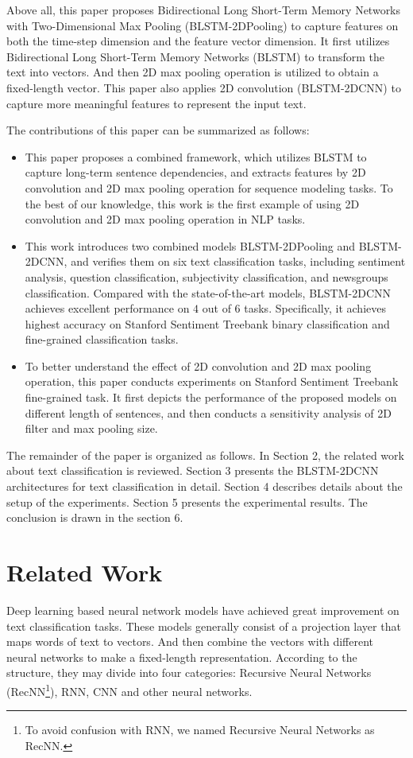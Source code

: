 \documentclass[11pt]{article}
\begin{document}
Above all, this paper proposes Bidirectional Long Short-Term Memory Networks with Two-Dimensional Max Pooling (BLSTM-2DPooling) to capture features on both the time-step dimension and the feature vector dimension. It first utilizes Bidirectional Long Short-Term Memory Networks (BLSTM) to transform the text into vectors. And then 2D max pooling operation is utilized to obtain a fixed-length vector. This paper also applies 2D convolution (BLSTM-2DCNN) to capture more meaningful features to represent the input text. 

The contributions of this paper can be summarized as follows:

\begin{itemize}
\item This paper proposes a combined framework, which utilizes BLSTM to capture long-term sentence dependencies, and extracts features by 2D convolution and 2D max pooling operation for sequence modeling tasks. To the best of our knowledge, this work is the first example of using 2D convolution and 2D max pooling operation in NLP tasks. 


\item This work introduces two combined models BLSTM-2DPooling and BLSTM-2DCNN, and verifies them on six text classification tasks, including sentiment analysis, question classification, subjectivity classification, and newsgroups classification. Compared with the state-of-the-art models, BLSTM-2DCNN achieves excellent performance on $4$ out of $6$ tasks. Specifically, it achieves highest accuracy on Stanford Sentiment Treebank binary classification and fine-grained classification tasks.

\item To better understand the effect of 2D convolution and 2D max pooling operation, this paper conducts experiments on Stanford Sentiment Treebank fine-grained task. It first depicts the performance of the proposed models on different length of sentences, and then conducts a sensitivity analysis of 2D filter and max pooling size. 
\end{itemize}

The remainder of the paper is organized as follows. In Section 2, the related work about text classification is reviewed. Section 3 presents the BLSTM-2DCNN architectures for text classification in detail. Section 4 describes details about the setup of the experiments. Section 5 presents the experimental results. The conclusion is drawn in the section 6.


\section{Related Work}
Deep learning based neural network models have achieved great improvement on text classification tasks. These models generally consist of a projection layer that maps words of text to vectors. And then combine the vectors with different neural networks to make a fixed-length representation. According to the structure, they may divide into four categories: Recursive Neural Networks (RecNN\footnote{To avoid confusion with RNN, we named Recursive Neural Networks as RecNN.}), RNN, CNN and other neural networks. 
\end{document}
